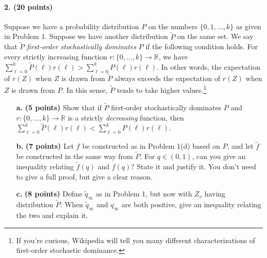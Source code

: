 \documentclass[11pt]{article}
\newcommand{\R}{\mathbb{R}}
\begin{document}
\paragraph{2. (20 points)}  Suppose we have a probability distribution $P$ on the numbers $\{0,1,\ldots,k\}$ as given in Problem 1. Suppose we have another distribution $\widetilde{P}$ on the same set. We say that $\widetilde{P}$ \emph{first-order stochastically dominates} $P$ if the following condition holds. For every strictly increasing function $r: \{0,\ldots,k\} \to \R$, we have $\sum_{\ell=0}^{k} \widetilde{P}(\ell)r(\ell) > \sum_{\ell=0}^{k} {P}(\ell)r(\ell) $. In other words, the expectation of $r(Z)$ when $Z$ is drawn from $\widetilde{P}$ always exceeds the expectation of $r(Z)$ when $Z$ is drawn from ${P}$. In this sense, $\widetilde{P}$ tends to take higher values.\footnote{If you're curious, Wikipedia will tell you many different characterizations of first-order stochastic dominance.}
\begin{itemize}
        \item[\textbf{a.}] \textbf{(5 points)} Show that if  $\widetilde{P}$ {first-order stochastically dominates} $P$  and $r: \{0,\ldots,k\} \to \R$ is a strictly \emph{decreasing} function, then   $\sum_{\ell=0}^{k} \widetilde{P}(\ell)r(\ell) < \sum_{\ell=0}^{k} {P}(\ell)r(\ell) $.
        \item[\textbf{b.}] \textbf{(7 points)} Let $f$ be constructed as in Problem 1(d) based on $P$, and let $\widetilde{f}$ be constructed in the same way from $\widetilde{P}$. For $q \in (0,1)$, can you give an inequality relating $\widetilde{f}(q)$ and ${f}(q)$? State it and justify it. You don't need to give a full proof, but give a clear reason.
        \item[\textbf{c.}] \textbf{(8 points)}  Define $\widetilde{q}_\infty$ as in Problem 1, but now with $Z_v$ having distribution $\widetilde{P}$. When $\widetilde{q}_\infty$ and $q_\infty$ are both positive, give an inequality relating the two and explain it.
\end{itemize}
\end{document}
